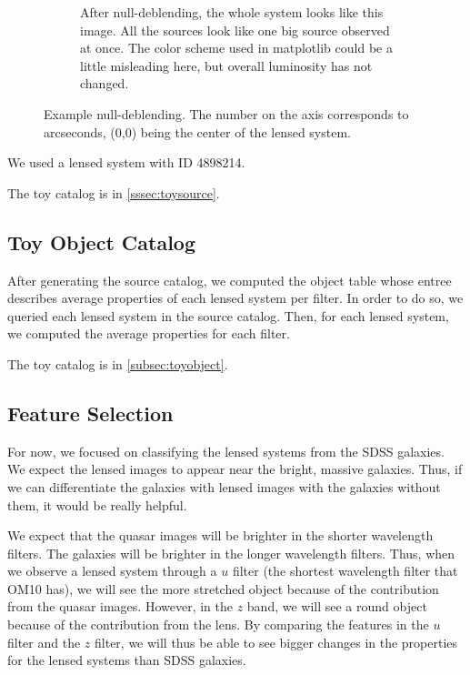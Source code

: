 \documentclass[\docopts]{\docclass}
\begin{document}
\begin{figure}
\begin{subfigure}[bt]{0.48\linewidth}
        \caption{After null-deblending, the whole system looks like this image. All the sources look like one big source observed at once.                                                                                                                                                                                 The color scheme used in matplotlib could be a little misleading here, but overall luminosity has not changed.}
    \end{subfigure}
    \caption{Example null-deblending. The number on the axis corresponds to arcseconds, (0,0) being the center of the lensed system.} 
    \label{fig:null-deblend}
\end{figure}

We used a lensed system with ID 4898214. 

The toy catalog is in \ref{sssec:toysource}.

\subsection{Toy Object Catalog}
\label{sssec:toyobject}

After generating the source catalog, we computed the object table whose entree describes average properties of each lensed system per filter. In order to do so, we queried each lensed system in the source catalog. Then, for each lensed system, we computed the average properties for each filter.

The toy catalog is in \ref{subsec:toyobject}.

\subsection{Feature Selection}
\label{subsec:feature}

For now, we focused on classifying the lensed systems from the SDSS galaxies. We expect the lensed images to appear near the bright, massive galaxies. Thus, if we can differentiate the galaxies with lensed images with the galaxies without them, it would be really helpful.

We expect that the quasar images will be brighter in the shorter wavelength filters. The galaxies will be brighter in the longer wavelength filters. Thus, when we observe a lensed system through a $u$ filter (the shortest wavelength filter that OM10 has), we will see the more stretched object because of the contribution from the quasar images. However, in the $z$ band, we will see a round object because of the contribution from the lens. By comparing the features in the $u$ filter and the $z$ filter, we will thus be able to see bigger changes in the properties for the lensed systems than SDSS galaxies.
\end{document}
